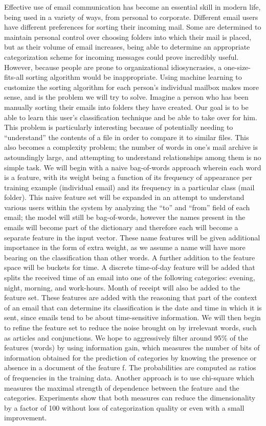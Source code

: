 \documentclass[11pt]{article}
\begin{document}
Effective use of email communication has become an essential skill in modern life, being used in a variety of ways, from personal to corporate.  Different email users have different preferences for sorting their incoming mail.  Some are determined to maintain personal control over choosing folders into which their mail is placed, but as their volume of email increases, being able to determine an appropriate categorization scheme for incoming messages could prove incredibly useful.  However, because people are prone to organizational idiosyncrasies, a one-size-fits-all sorting algorithm would be inappropriate.  Using machine learning to customize the sorting algorithm for each person's individual mailbox makes more sense, and is the problem we will try to solve.
Imagine a person who has been manually sorting their emails into folders they have created. Our goal is to be able to learn this user’s classification technique and be able to take over for him. This problem is particularly interesting because of potentially needing to “understand” the contents of a file in order to compare it to similar files. This also becomes a complexity problem; the number of words in one’s mail archive is astoundingly large, and attempting to understand relationships among them is no simple task.
We will begin with a naive bag-of-words approach wherein each word is a feature, with its weight being a function of its frequency of appearance per training example (individual email) and its frequency in a particular class (mail folder). This naive feature set will be expanded in an attempt to understand various users within the system by analyzing the “to” and “from” field of each email; the model will still be bag-of-words, however the names present in the emails will become part of the dictionary and therefore each will become a separate feature in the input vector. These name features will be given additional importance in the form of extra weight, as we assume a name will have more bearing on the classification than other words. A further addition to the feature space will be buckets for time. A discrete time-of-day feature will be added that splits the received time of an email into one of the following categories: evening, night, morning, and work-hours. Month of receipt will also be added to the feature set. These features are added with the reasoning that part of the context of an email that can determine its classification is the date and time in which it is sent, since emails tend to be about time-sensitive information.
We will then begin to refine the feature set to reduce the noise brought on by irrelevant words, such as articles and conjunctions. We hope to aggressively filter around 95\% of the features (words) by using information gain, which measures the number of bits of information obtained for the prediction of categories by knowing the presence or absence in a document of the feature f. The probabilities are computed as ratios of frequencies in the training data. Another approach is to use chi-square which measures the maximal strength of dependence between the feature and the categories. Experiments show that both measures can reduce the dimensionality by a factor of 100 without loss of categorization quality or even with a small improvement.
\end{document}
